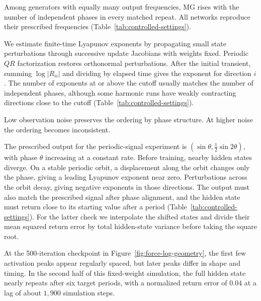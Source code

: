 {Among generators with equally many output frequencies, MG rises with the number of independent phases in every matched repeat. All networks reproduce their prescribed frequencies (Table~\ref{tab:controlled-settings}).

We estimate finite-time Lyapunov exponents by propagating small state perturbations through successive update Jacobians with weights fixed. Periodic $QR$ factorization restores orthonormal perturbations. After the initial transient, summing $\log|R_{ii}|$ and dividing by elapsed time gives the exponent for direction $i$. The number of exponents at or above the cutoff usually matches the number of independent phases, although some harmonic runs have weakly contracting directions close to the cutoff (Table~\ref{tab:controlled-settings}).

Low observation noise preserves the ordering by phase structure. At higher noise the ordering becomes inconsistent.

The prescribed output for the periodic-signal experiment is $(\sin\theta,\tfrac12\sin 2\theta)$, with phase $\theta$ increasing at a constant rate. Before training, nearby hidden states diverge. On a stable periodic orbit, a displacement along the orbit changes only the phase, giving a leading Lyapunov exponent near zero. Perturbations across the orbit decay, giving negative exponents in those directions. The output must also match the prescribed signal after phase alignment, and the hidden state must return close to its starting value after a period (Table~\ref{tab:controlled-settings}). For the latter check we interpolate the shifted states and divide their mean squared return error by total hidden-state variance before taking the square root.

At the 500-iteration checkpoint in Figure~\ref{fig:force-log-geometry}, the first few activation peaks appear regularly spaced, but later peaks differ in shape and timing. In the second half of this fixed-weight simulation, the full hidden state nearly repeats after six target periods, with a normalized return error of $0.04$ at a lag of about $1{,}900$ simulation steps.

}
